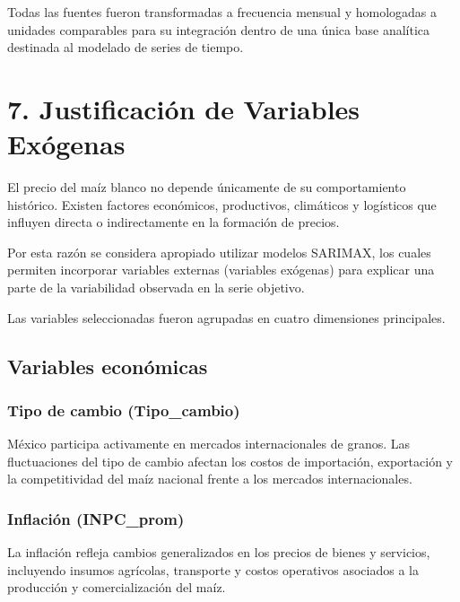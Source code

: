 \documentclass[11pt]{article}
\begin{document}
Todas las fuentes fueron transformadas a frecuencia mensual y
homologadas a unidades comparables para su integración dentro de una
única base analítica destinada al modelado de series de tiempo.

    \hypertarget{justificaciuxf3n-de-variables-exuxf3genas}{%
\section{7. Justificación de Variables
Exógenas}\label{justificaciuxf3n-de-variables-exuxf3genas}}

El precio del maíz blanco no depende únicamente de su comportamiento
histórico. Existen factores económicos, productivos, climáticos y
logísticos que influyen directa o indirectamente en la formación de
precios.

Por esta razón se considera apropiado utilizar modelos SARIMAX, los
cuales permiten incorporar variables externas (variables exógenas) para
explicar una parte de la variabilidad observada en la serie objetivo.

Las variables seleccionadas fueron agrupadas en cuatro dimensiones
principales.

\hypertarget{variables-econuxf3micas}{%
\subsection{Variables económicas}\label{variables-econuxf3micas}}

\hypertarget{tipo-de-cambio-tipo_cambio}{%
\subsubsection{Tipo de cambio
(Tipo\_cambio)}\label{tipo-de-cambio-tipo_cambio}}

México participa activamente en mercados internacionales de granos. Las
fluctuaciones del tipo de cambio afectan los costos de importación,
exportación y la competitividad del maíz nacional frente a los mercados
internacionales.

\hypertarget{inflaciuxf3n-inpc_prom}{%
\subsubsection{Inflación (INPC\_prom)}\label{inflaciuxf3n-inpc_prom}}

La inflación refleja cambios generalizados en los precios de bienes y
servicios, incluyendo insumos agrícolas, transporte y costos operativos
asociados a la producción y comercialización del maíz.
\end{document}
